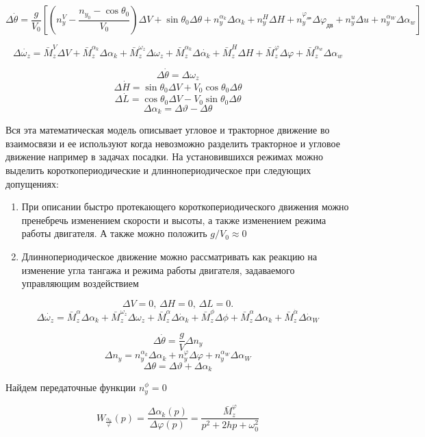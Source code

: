 \documentclass{article}
\begin{document}
\[
\Delta \dot{\theta} = \frac{g}{V_0} [(n_{y}^{V} - \frac{n_{y_0} - \cos{\theta_0}}{V_0}) \Delta V + \sin{\theta_0} \Delta \theta + n_{y}^{\alpha_k} \Delta \alpha_k + n_{y}^{H} \Delta H + n_{y}^{\varphi_{дв}} \Delta \varphi_{дв} + n_{y}^{u} \Delta u + n_{y}^{\alpha_W} \Delta \alpha_{w}]
\]

\[
\Delta \dot{\omega_{z}} = \bar{M}_z^V \Delta V + \bar{M}_z^{\alpha_k} \Delta \alpha_k + \bar{M}_z^{\omega_z} \Delta \omega_z + \bar{M}_z^{\alpha_k} \Delta \dot{\alpha_k} + \bar{M}_z^H \Delta H + \bar{M}_z^\varphi \Delta \varphi + \bar{M}_z^{\alpha_{w}} \Delta \alpha_w
\]

\[
\Delta \dot{\theta} = \Delta \omega_z
\]
\[
\Delta \dot{H} = \sin{\theta_0} \Delta V + V_0 \cos{\theta_0} \Delta \theta
\]
\[
\Delta \dot{L} = \cos{\theta_0}\Delta V - V_0 \sin{\theta_0} \Delta \theta
\]
\[
\Delta \alpha_k = \Delta \vartheta - \Delta \theta
\]

Вся эта математическая модель описывает угловое и тракторное движение во взаимосвязи и ее используют когда невозможно разделить тракторное и угловое движение например в задачах посадки. На установившихся режимах можно выделить короткопериодические и длиннопериодическое при следующих допущениях: 
\begin{enumerate}
\item При описании быстро протекающего короткопериодического движения можно пренебречь изменением скорости и высоты, а также изменением режима работы двигателя. А также можно положить $g/V_0 \approx 0$
\item Длиннопериодическое движение можно рассматривать как реакцию на изменение угла тангажа и режима работы двигателя, задаваемого управляющим воздействием
\end{enumerate}
\[
\Delta V = 0, \, \Delta H = 0, \, \Delta L = 0.
\]
\[
\Delta \dot{\omega_z} = \bar{M}_z^{\alpha} \Delta \alpha_k + \bar{M}_z^{\omega_z} \Delta \omega_z + \bar{M}_z^\alpha \Delta \dot{\alpha}_k + \bar{M}_z^\phi \Delta \phi + \bar{M}_z^\alpha \Delta \alpha_k + \bar{M}_z
^{\dot{\alpha}} \Delta \dot{\alpha}_W
\]

\[
\Delta \dot{\theta} = \frac{g}{V} \Delta n_y
\]
\[
\Delta n_y = n_y^{\alpha_k} \Delta \alpha_k + n_y^{\varphi} \Delta \varphi + n_y^{\alpha_W} \Delta \alpha_W
\]
\[
\Delta \theta = \Delta \vartheta + \Delta \alpha_k
\]

Найдем передаточные функции $n_y^\phi= 0$

\begin{equation}\label{eqn:per_alpha}
W_{\frac{\alpha_k}{\varphi}}(p) = \frac{\Delta \alpha_k(p)}{\Delta \varphi(p)} = \frac{\bar{M}_z^\varphi}{p^2 + 2hp + \omega_0^2}
\end{equation}
\end{document}
